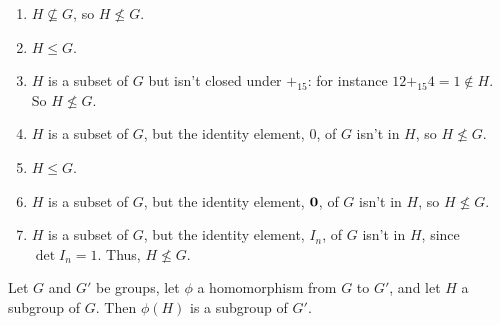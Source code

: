 \begin{solution}[print=true]
\begin{enumerate}
\item $H\not\subseteq G$, so $H\not\leq G$.
\item $H\leq G$.
\item $H$ is a subset of $G$ but isn't closed under $+_{15}$: for instance $12+_{15}4=1\not\in H$.  So $H\not\leq G$.
\item $H$ is a subset of $G$, but the identity element, 0, of $G$ isn't in $H$, so $H\not\leq G$.
\item $H\leq G$.
\item $H$ is a subset of $G$, but the identity element, $\mathbf 0$, of $G$ isn't in $H$, so $H\not\leq G$.
\item $H$ is a subset of $G$, but the identity element, $I_n$, of $G$ isn't in $H$, since $\det I_n=1$.  Thus, $H\not\leq G$.
\end{enumerate}
\end{solution}


\begin{comment}
\begin{exercise}[ID=4C]

\begin{enumerate}
\item
Draw the subgroup lattices for the groups $\Z_2 \times \Z_3$ and $\Z_2 \times \Z_4$. (Identify each subgroup in the following lattices explicitly, either by listing its elements within set brackets, or by otherwise identifying it using precise mathematical notation.)

\item Would it be reasonable for me to ask you to draw the complete subgroup lattice for $\Z$?  If so, draw it; otherwise, explain why that's an unreasonable request. \textbf{Make sure any sentences you write are grammatically correct.}

\end{enumerate}
\end{exercise}

\begin{solution}[print=true]
\end{solution}

\end{comment}

\begin{exercise}
 Let $G$ and $G'$ be groups, let $\phi$ a homomorphism from $G$ to $G'$, and let $H$ a subgroup of $G$.  Then $\phi(H)$ is a subgroup of $G'$.
 \end{exercise}

